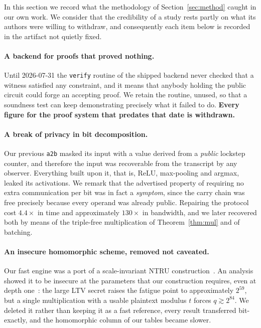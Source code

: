 \documentclass[11pt]{article}
\newcommand{\bt}[1]{\texttt{#1}}
\newcommand{\ReLU}{\ensuremath{\mathrm{ReLU}}}
\begin{document}
\label{sec:withdrawn}

In this section we record what the methodology of Section~\ref{sec:method} caught in our own
work. We consider that the credibility of a study rests partly on what its authors were willing to
withdraw, and consequently each item below is recorded in the artifact not quietly fixed.

\paragraph{A backend for proofs that proved nothing.} Until 2026-07-31 the \bt{verify}
routine of the shipped backend never checked that a witness satisfied any constraint, and it means
that anybody holding the public circuit could forge an accepting proof. We retain the routine,
unused, so that a soundness test can keep demonstrating precisely what it failed to do.
\textbf{Every figure for the proof system that predates that date is withdrawn.}

\paragraph{A break of privacy in bit decomposition.} Our previous \bt{a2b} masked its input
with a value derived from a \emph{public} lockstep counter, and therefore the input was recoverable
from the transcript by any observer. Everything built upon it, that is, $\ReLU$, max-pooling and
argmax, leaked its activations. We remark that the advertised property of requiring no extra
communication per bit was in fact a \emph{symptom}, since the carry chain was free precisely because
every operand was already public. Repairing the protocol cost $4.4\times$ in time and approximately
$130\times$ in bandwidth, and we later recovered both by means of the triple-free multiplication of
Theorem~\ref{thm:mul} and of batching.

\paragraph{An insecure homomorphic scheme, removed not caveated.} Our fast engine was
a port of a scale-invariant NTRU construction~\cite{LTV,YASHE}. An analysis showed it to be insecure
at the parameters that our construction requires, even at depth
one~\cite{ABDucas,KirchnerFouque,DucasvanWoerden}: the large LTV secret raises the fatigue point to
approximately $2^{59}$, but a single multiplication with a usable plaintext modulus $t$ forces
$q \gtrsim 2^{84}$. We deleted it rather than keeping it as a fast reference, every result
transferred bit-exactly, and the homomorphic column of our tables became slower.
\end{document}
